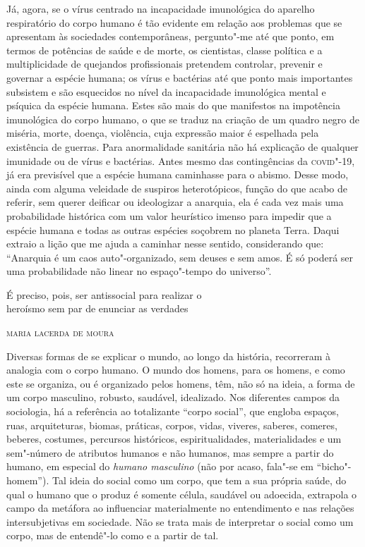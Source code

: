 Já, agora, se o vírus centrado na incapacidade imunológica do aparelho
respiratório do corpo humano é tão evidente em relação aos problemas que
se apresentam às sociedades contemporâneas, pergunto"-me até que ponto,
em termos de potências de saúde e de morte, os cientistas, classe
política e a multiplicidade de quejandos profissionais pretendem
controlar, prevenir e governar a espécie humana; os vírus e bactérias
até que ponto mais importantes subsistem e são esquecidos no nível da
incapacidade imunológica mental e psíquica da espécie humana. Estes são
mais do que manifestos na impotência imunológica do corpo humano, o que
se traduz na criação de um quadro negro de miséria, morte, doença,
violência, cuja expressão maior é espelhada pela existência de guerras.
Para anormalidade sanitária não há explicação de qualquer imunidade ou
de vírus e bactérias. Antes mesmo das contingências da \textsc{covid}"-19, já era
previsível que a espécie humana caminhasse para o abismo. Desse modo,
ainda com alguma veleidade de suspiros heterotópicos, função do que
acabo de referir, sem querer deificar ou ideologizar a anarquia, ela é
cada vez mais uma probabilidade histórica com um valor heurístico imenso
para impedir que a espécie humana e todas as outras espécies soçobrem no
planeta Terra. Daqui extraio a lição que me ajuda a caminhar nesse
sentido, considerando que: ``Anarquia é um caos auto"-organizado, sem
deuses e sem amos. É só poderá ser uma probabilidade não linear no
espaço"-tempo do universo''.




\epigraph{É preciso, pois, ser antissocial para realizar o\\
heroísmo sem par de enunciar as verdades}{\textsc{maria lacerda de moura}}

\noindent{}Diversas formas de se explicar o mundo,
ao longo da história, recorreram à analogia com o corpo humano. O mundo
dos homens, para os homens, e como este se organiza, ou é organizado
pelos homens, têm, não só na ideia, a forma de um corpo masculino,
robusto, saudável, idealizado. Nos diferentes campos da sociologia, há a
referência ao totalizante ``corpo social'', que engloba espaços, ruas,
arquiteturas, biomas, práticas, corpos, vidas, viveres, saberes,
comeres, beberes, costumes, percursos históricos, espiritualidades,
materialidades e um sem"-número de atributos humanos e não humanos, mas
sempre a partir do humano, em especial do \emph{humano masculino} (não
por acaso, fala"-se em ``bicho"-homem''). Tal ideia do social como um
corpo, que tem a sua própria saúde, do qual o humano que o produz é
somente célula, saudável ou adoecida, extrapola o campo da metáfora ao
influenciar materialmente no entendimento e nas relações intersubjetivas
em sociedade. Não se trata mais de interpretar o social como um corpo,
mas de entendê"-lo como e a partir de tal.


